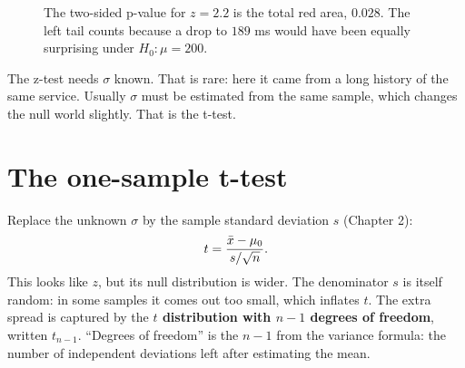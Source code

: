 \begin{figure}[H]
\centering
{}
\caption{The two-sided p-value for $z=2.2$ is the total red area, $0.028$. The left
tail counts because a drop to $189$ ms would have been equally surprising under
$H_0\colon\mu=200$.}
\label{fig:ht-ztail}
\end{figure}

The z-test needs $\sigma$ known. That is rare: here it came from a long history of
the same service. Usually $\sigma$ must be estimated from the same sample, which
changes the null world slightly. That is the t-test.

\section{The one-sample t-test}
\label{sec:ht-t1}

Replace the unknown $\sigma$ by the sample standard deviation $s$ (Chapter 2):
\[
  t = \frac{\bar{x} - \mu_0}{s/\sqrt n}.
\]
This looks like $z$, but its null distribution is wider. The denominator $s$ is
itself random: in some samples it comes out too small, which inflates $t$. The extra
spread is captured by the \textbf{$t$ distribution with $n-1$ degrees of freedom},
written $t_{n-1}$. ``Degrees of freedom'' is the $n-1$ from the variance formula: the
number of independent deviations left after estimating the mean.

